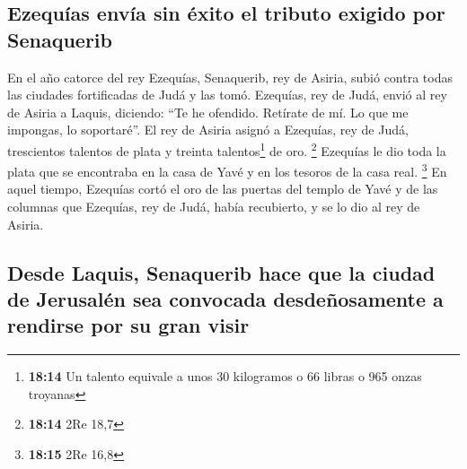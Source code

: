 \hypertarget{ezequuxedas-envuxeda-sin-uxe9xito-el-tributo-exigido-por-senaquerib}{%
\subsection{Ezequías envía sin éxito el tributo exigido por
Senaquerib}\label{ezequuxedas-envuxeda-sin-uxe9xito-el-tributo-exigido-por-senaquerib}}

 En el año catorce del rey Ezequías, Senaquerib, rey de
Asiria, subió contra todas las ciudades fortificadas de Judá y las tomó.
 Ezequías, rey de Judá, envió al rey de Asiria a Laquis,
diciendo: ``Te he ofendido. Retírate de mí. Lo que me impongas, lo
soportaré''. El rey de Asiria asignó a Ezequías, rey de Judá,
trescientos talentos de plata y treinta talentos\footnote{\textbf{18:14}
  Un talento equivale a unos 30 kilogramos o 66 libras o 965 onzas
  troyanas} de oro. \footnote{\textbf{18:14} 2Re 18,7} 
Ezequías le dio toda la plata que se encontraba en la casa de Yavé y en
los tesoros de la casa real. \footnote{\textbf{18:15} 2Re 16,8}
 En aquel tiempo, Ezequías cortó el oro de las puertas
del templo de Yavé y de las columnas que Ezequías, rey de Judá, había
recubierto, y se lo dio al rey de Asiria.

\hypertarget{desde-laquis-senaquerib-hace-que-la-ciudad-de-jerusaluxe9n-sea-convocada-desdeuxf1osamente-a-rendirse-por-su-gran-visir}{%
\subsection{Desde Laquis, Senaquerib hace que la ciudad de Jerusalén sea
convocada desdeñosamente a rendirse por su gran
visir}\label{desde-laquis-senaquerib-hace-que-la-ciudad-de-jerusaluxe9n-sea-convocada-desdeuxf1osamente-a-rendirse-por-su-gran-visir}}

